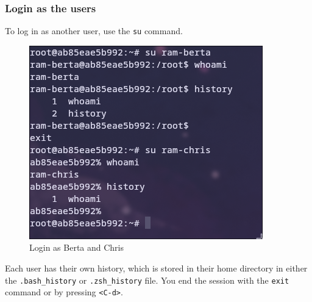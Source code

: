 \documentclass[a4paper]{article}
\begin{document}
\subsubsection{Login as the users}

To log in as another user, use the \texttt{su} command.

\begin{figure}[h]
	\centering
	\includegraphics[scale=0.3]{images/logggingin.png}
	\caption{Login as Berta and Chris}
\end{figure}
Each user has their own history, which is stored in their home directory in either the \texttt{.bash\_history} or \texttt{.zsh\_history} file. You end the session with the \texttt{exit} command or by pressing \texttt{<C-d>}.
\end{document}
